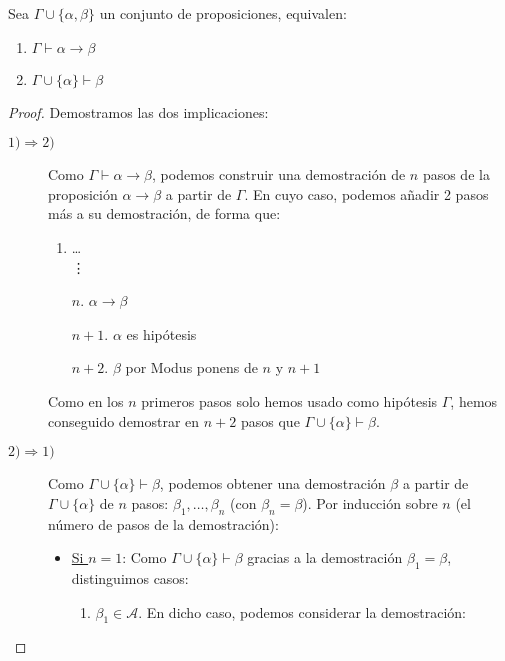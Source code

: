 \begin{teo}\label{teo:herbrand}
    Sea $\Gamma\cup\{\alpha,\beta\}$ un conjunto de proposiciones, equivalen:
    \begin{enumerate}
        \item $\Gamma\vdash \alpha\to\beta$
        \item $\Gamma\cup\{\alpha\}\vdash \beta$
    \end{enumerate}
    \begin{proof}
        Demostramos las dos implicaciones:
        \begin{description}
            \item [$1) \Longrightarrow 2)$]
                Como $\Gamma\vdash \alpha\to\beta$, podemos construir una demostración de $n$ pasos de la proposición $\alpha\to\beta$ a partir de $\Gamma$. En cuyo caso, podemos añadir 2 pasos más a su demostración, de forma que:
                \begin{enumerate}
                    \item \ldots \\
                        \vdots 
                    \item[$n$.] $\alpha\to\beta$
                    \item[$n+1$.] $\alpha$ es hipótesis
                    \item[$n+2$.] $\beta$ por Modus ponens de $n$ y $n+1$
                \end{enumerate}
                Como en los $n$ primeros pasos solo hemos usado como hipótesis $\Gamma$, hemos conseguido demostrar en $n+2$ pasos que $\Gamma\cup\{\alpha\}\vdash \beta$.
            \item [$2) \Longrightarrow 1)$] 
                Como $\Gamma\cup\{\alpha\}\vdash \beta$, podemos obtener una demostración $\beta$ a partir de $\Gamma\cup\{\alpha\}$ de $n$ pasos: $\beta_1,\ldots,\beta_n$ (con $\beta_n=\beta$). Por inducción sobre $n$ (el número de pasos de la demostración):
                \begin{itemize}
                    \item \underline{Si $n=1$}: Como $\Gamma\cup\{\alpha\}\vdash \beta$ gracias a la demostración $\beta_1=\beta$, distinguimos casos:
                        \begin{enumerate}[label=(\alph*)]
                            \item $\beta_1\in \mathcal{A}$. En dicho caso, podemos considerar la demostración:
                                \begin{enumerate}[label=\arabic*.]

\end{enumerate}
\end{enumerate}
\end{itemize}
\end{description}
\end{proof}
\end{teo}
